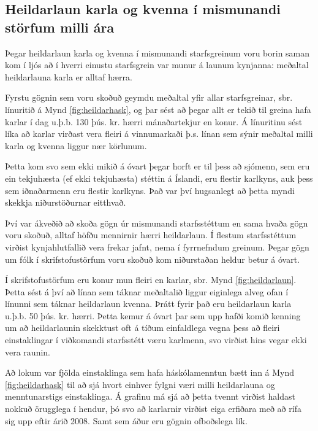 \subsection{Heildarlaun karla og kvenna í mismunandi störfum milli ára}
Þegar heildarlaun karla og kvenna í mismunandi starfsgreinum voru borin saman kom í ljós að í hverri einustu starfsgrein var munur á launum kynjanna: meðaltal heildarlauna karla er alltaf hærra.

Fyrstu gögnin sem voru skoðuð geymdu meðaltal yfir allar starfsgreinar, sbr. línuritið á Mynd \ref{fig:heildarhask}, og þar sést að þegar allt er tekið til greina hafa karlar í dag u.þ.b. 130 þús. kr. hærri mánaðartekjur en konur. Á línuritinu sést líka að karlar virðast vera fleiri á vinnumarkaði þ.s. línan sem sýnir meðaltal milli karla og kvenna liggur nær körlunum.

Þetta kom svo sem ekki mikið á óvart þegar horft er til þess að sjómenn, sem eru ein tekjuhæsta (ef ekki tekjuhæsta) stéttin á Íslandi, eru flestir karlkyns, auk þess sem iðnaðarmenn eru flestir karlkyns. 
Það var því hugsanlegt að þetta myndi skekkja niðurstöðurnar eitthvað.

Því var ákveðið að skoða gögn úr mismunandi starfsstéttum en sama hvaða gögn voru skoðuð, alltaf höfðu mennirnir hærri heildarlaun. Í flestum starfsstéttum virðist kynjahlutfallið vera frekar jafnt, nema í fyrrnefndum greinum. Þegar gögn um fólk í skrifstofustörfum voru skoðuð kom niðurstaðan heldur betur á óvart.

Í skrifstofustörfum eru konur mun fleiri en karlar, sbr. Mynd \ref{fig:heildarlaun}. Þetta sést á því að línan sem táknar meðaltalið liggur eiginlega alveg ofan í línunni sem táknar heildarlaun kvenna. Þrátt fyrir það eru heildarlaun karla u.þ.b. 50 þús. kr. hærri. Þetta kemur á óvart þar sem upp hafði komið kenning um að heildarlaunin skekktust oft á tíðum einfaldlega vegna þess að fleiri einstaklingar í viðkomandi starfsstétt væru karlmenn, svo virðist hins vegar ekki vera raunin.

Að lokum var fjölda einstaklinga sem hafa háskólamenntun bætt inn á Mynd \ref{fig:heildarhask} til að sjá hvort einhver fylgni væri milli heildarlauna og menntunarstigs einstaklinga. Á grafinu má sjá að þetta tvennt virðist haldast nokkuð örugglega í hendur, þó svo að karlarnir virðist eiga erfiðara með að rífa sig upp eftir árið 2008. Samt sem áður eru gögnin ofboðslega lík.